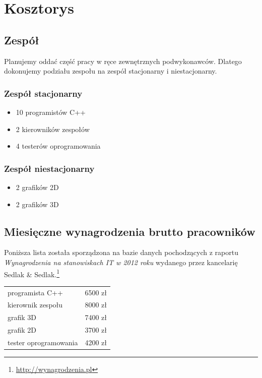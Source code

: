 \documentclass{mwrep}
\begin{document}
\chapter{Kosztorys}

\section{Zespół}

Planujemy oddać część pracy w ręce zewnętrznych podwykonawców. Dlatego dokonujemy podziału zespołu na zespół stacjonarny i niestacjonarny.

\subsection{Zespół stacjonarny}

\begin{itemize}
\item 10 programistów C++
\item 2 kierowników zespołów
\item 4 testerów oprogramowania
\end{itemize}

\subsection{Zespół niestacjonarny}

\begin{itemize}
\item 2 grafików 2D
\item 2 grafików 3D
\end{itemize}

\section{Miesięczne wynagrodzenia brutto pracowników}

Poniższa lista została sporządzona na bazie danych pochodzących z raportu \emph{Wynagrodzenia na stanowiskach IT w 2012 roku} wydanego przez kancelarię Sedlak \& Sedlak.\footnote{\url{http://wynagrodzenia.pl}} \\

\begin{tabular}{lr}
programista C++ & 6500 zł \\
kierownik zespołu & 8000 zł \\
grafik 3D & 7400 zł \\
grafik 2D & 3700 zł \\
tester oprogramowania & 4200 zł
\end{tabular}
\end{document}
